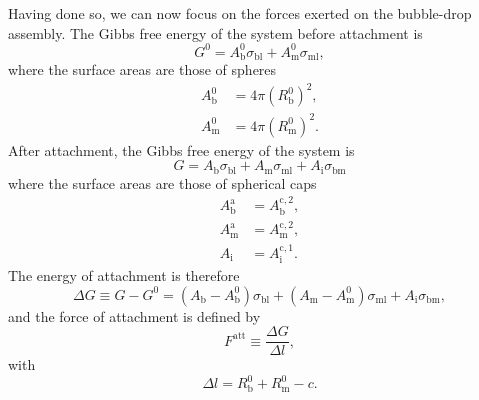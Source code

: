 \documentclass{article}
\begin{document}
Having done so, we can now focus on the forces exerted on the bubble-drop
assembly. The Gibbs free energy of the system before attachment is
\begin{equation}
    G^0
    =
      A^0_\text{b}\sigma_\text{bl} 
    + A^0_\text{m}\sigma_\text{ml}
    ,
    \label{eq:G_sep}
\end{equation}
where the surface areas are those of spheres
\begin{align}
    A_\text{b}^0 &= 4\pi \left(R^0_\text{b}\right)^2
    ,\\
    A_\text{m}^0 &= 4\pi \left(R^0_\text{m}\right)^2
    .
\end{align}
After attachment, the Gibbs free energy of the system is
\begin{equation}
    G
    = 
      A_\text{b}\sigma_\text{bl} 
    + A_\text{m}\sigma_\text{ml}
    + A_\text{i}\sigma_\text{bm}
    \label{eq:G_att}
\end{equation}
where the surface areas are those of spherical caps
\begin{align}
    A^\text{a}_\text{b} &= A^{\text{c},2}_\text{b}
    ,\\
    A^\text{a}_\text{m} &= A^{\text{c},2}_\text{m}
    ,\\
    A_\text{i} &= A^{\text{c},1}_\text{i}
    .
\end{align}
The energy of attachment is therefore
\begin{equation}
    \Delta G \equiv G - G^0 =  
      (A_\text{b} - A^0_\text{b})\sigma_\text{bl} 
    + (A_\text{m} - A^0_\text{m})\sigma_\text{ml}
    + A_\text{i}\sigma_\text{bm}
    ,
    \label{eq:DG}
\end{equation}
and the force of attachment is defined by 
\begin{equation}
    F^\text{att} \equiv \frac{\Delta G}{\Delta l},
    \label{eq:Fatt}
\end{equation}
with
\begin{equation}
    \Delta l = R^0_\text{b} + R^0_\text{m} - c.
    \label{eq:Dl}
\end{equation}
\end{document}
